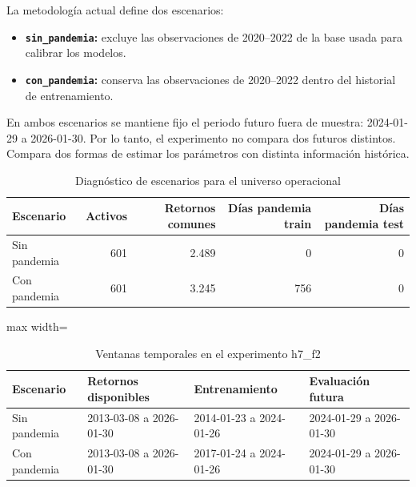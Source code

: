 La metodología actual define dos escenarios:

\begin{itemize}
  \item \textbf{\texttt{sin\_pandemia}:} excluye las observaciones de 2020--2022
        de la base usada para calibrar los modelos.
  \item \textbf{\texttt{con\_pandemia}:} conserva las observaciones de 2020--2022
        dentro del historial de entrenamiento.
\end{itemize}

En ambos escenarios se mantiene fijo el periodo futuro fuera de muestra:
2024-01-29 a 2026-01-30. Por lo tanto, el experimento no compara dos futuros
distintos. Compara dos formas de estimar los parámetros con distinta
información histórica.

\begin{table}[H]
  \centering
  \caption{Diagnóstico de escenarios para el universo operacional}
  \label{tab:anexo2_escenarios_pandemia}
  \small
  \begin{tabular}{lrrrr}
    \toprule
    \textbf{Escenario} & \textbf{Activos} & \textbf{Retornos comunes}
    & \textbf{Días pandemia train} & \textbf{Días pandemia test} \\
    \midrule
    Sin pandemia & 601 & 2.489 & 0 & 0 \\
    Con pandemia & 601 & 3.245 & 756 & 0 \\
    \bottomrule
  \end{tabular}
\end{table}

\begin{table}[H]
  \centering
  \caption{Ventanas temporales en el experimento h7\_f2}
  \label{tab:anexo2_ventanas_pandemia}
  \small
  \begin{adjustbox}{max width=\textwidth}
  \begin{tabular}{llll}
    \toprule
    \textbf{Escenario} & \textbf{Retornos disponibles}
    & \textbf{Entrenamiento} & \textbf{Evaluación futura} \\
    \midrule
    Sin pandemia & 2013-03-08 a 2026-01-30
      & 2014-01-23 a 2024-01-26
      & 2024-01-29 a 2026-01-30 \\
    Con pandemia & 2013-03-08 a 2026-01-30
      & 2017-01-24 a 2024-01-26
      & 2024-01-29 a 2026-01-30 \\
    \bottomrule
  \end{tabular}
  \end{adjustbox}
\end{table}

